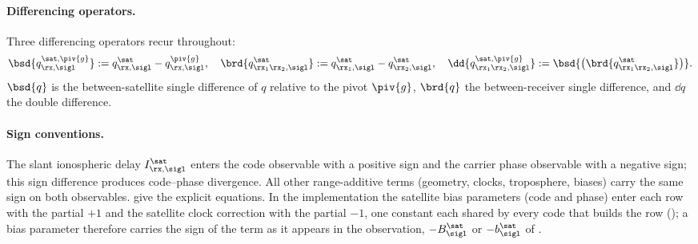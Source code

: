 \paragraph{Differencing operators.}
Three differencing operators recur throughout:
\begin{equation*}
\bsd{q^{\sat,\piv{g}}_{\rx,\sigl}}
  := q^\sat_{\rx,\sigl} - q^{\piv{g}}_{\rx,\sigl},
\quad
\brd{q^{\sat}_{\rx_1\rx_2,\sigl}}
  := q^\sat_{\rx_1,\sigl} - q^\sat_{\rx_2,\sigl},
\quad
\dd{q^{\sat,\piv{g}}_{\rx_1\rx_2,\sigl}}
  := \bsd{\big(\brd{q^\sat_{\rx_1\rx_2,\sigl}}\big)}.
\end{equation*}
$\bsd{q}$ is the between-satellite single difference of $q$
relative to the pivot $\piv{g}$, $\brd{q}$ the between-receiver
single difference, and $\dd{q}$ the double difference.

\paragraph{Sign conventions.}
The slant ionospheric delay $I^\sat_{\rx,\sigl}$ enters the code
observable with a positive sign and the carrier phase observable with a
negative sign; this sign difference produces code--phase divergence.
All other range-additive terms (geometry, clocks, troposphere, biases)
carry the same sign on both observables.
 give the explicit equations.  In the
implementation the satellite bias parameters (code and phase) enter each row
with the partial $+1$ and the satellite clock correction with the partial
$-1$, one constant each shared by every code that builds the row
(); a bias parameter therefore carries the sign of
the term as it appears in the observation, $-B^\sat_\sigl$ or
$-b^\sat_\sigl$ of .

